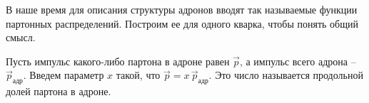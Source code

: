 \documentclass[12pt, a4paper]{article}
\begin{document}
%
%
%

В наше время для описания структуры адронов вводят так называемые функции партонных распределений. Построим ее для одного кварка, чтобы понять общий смысл.

Пусть импульс какого-либо партона в адроне равен $\vec{p}$, а импульс всего адрона -- $\vec{p}_{\text{адр}}$. Введем параметр $x$ такой, что $\vec{p}=x\,\vec{p}_{\text{адр}}$. Это число называется продольной долей партона в адроне.
\end{document}
